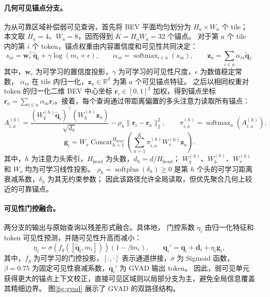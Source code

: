 \documentclass[a4paper,fleqn]{cas-sc}
\newcommand{\R}{\mathbb{R}}
\newcommand{\softmax}{\operatorname{softmax}}
\begin{document}
\paragraph{几何可见锚点分支。}
为从可靠区域补偿弱可见查询，首先将 BEV 平面均匀划分为 $H_a\times W_a$ 个 tile；
本文取 $H_a=4$、$W_a=8$，因而得到 $K=H_aW_a=32$ 个锚点。
对于第 $a$ 个 tile 内的第 $i$ 个 token，锚点权重由内容置信度和可见性共同决定：
\begin{equation}
s_{ia}=\bm{w}_c^\top\tilde{\bm{q}}_i+\gamma\log(m_i+\epsilon),\qquad
\alpha_{ia}=\softmax_{i\in a}(s_{ia}),\qquad
\bm{z}_a=\sum_{i\in a}\alpha_{ia}\tilde{\bm{q}}_i .
\end{equation}
其中，$\bm{w}_c$ 为可学习的置信度投影，$\gamma$ 为可学习的可见性尺度，$\epsilon$ 为数值稳定常数，
$\alpha_{ia}$ 在 tile 内归一化，$\bm{z}_a\in\R^d$ 为第 $a$ 个可见锚点特征。
之后以相同权重对 token 的归一化二维 BEV 中心坐标 $\bm{r}_i\in[0,1]^2$ 加权，得到锚点坐标
$\bm{r}_a=\sum_{i\in a}\alpha_{ia}\bm{r}_i$。接着，每个查询通过带距离偏置的多头注意力读取所有锚点：
\begin{equation}
A_{i,a}^{(h)}=\frac{(W_q^{(h)}\tilde{\bm{q}}_i)^\top(W_k^{(h)}\bm{z}_a)}{\sqrt{d_h}}
-\rho_h\|\bm{r}_i-\bm{r}_a\|_2^2,\qquad
\pi_{i,a}^{(h)}=\softmax_a\left(A_{i,a}^{(h)}\right),
\end{equation}
\begin{equation}
\bm{g}_i=W_o\operatorname{Concat}_{h=1}^{H_{\mathrm{head}}}
\left(\sum_{a=1}^{K}\pi_{i,a}^{(h)}W_v^{(h)}\bm{z}_a\right).
\end{equation}
其中，$h$ 为注意力头索引，$H_{\mathrm{head}}$ 为头数，$d_h=d/H_{\mathrm{head}}$；
$W_q^{(h)}$、$W_k^{(h)}$、$W_v^{(h)}$ 和 $W_o$ 均为可学习线性投影。
$\rho_h=\operatorname{softplus}(\delta_h)\geq0$ 是第 $h$ 个头的可学习距离衰减系数，$\delta_h$ 为其无约束参数；
因此该路径允许全局读取，但优先聚合几何上较近的可靠锚点。

\paragraph{可见性门控融合。}
两分支的输出与原始查询以残差形式融合。具体地，
门控系数 $\eta_i$ 由归一化特征和 token 可见性预测，并随可见性升高而减小：
\begin{equation}
\eta_i=\sigma\left(f_g([\tilde{\bm{q}}_i,m_i])\right)(1-\beta m_i),\qquad
\bm{q}_i'=\bm{q}_i+\bm{d}_i+\eta_i\bm{g}_i,
\end{equation}
其中，$f_g$ 为可学习的门控投影，$[\cdot,\cdot]$ 表示通道拼接，$\sigma$ 为 Sigmoid 函数，
$\beta=0.75$ 为固定可见性衰减系数，$\bm{q}_i'$ 为 GVAD 输出 token。
因此，弱可见单元获得更大的锚点上下文校正，直接可见区域则以局部分支为主，避免全局信息覆盖其精细边界。
图\ref{fig:gvad} 展示了 GVAD 的双路径结构。
\end{document}
